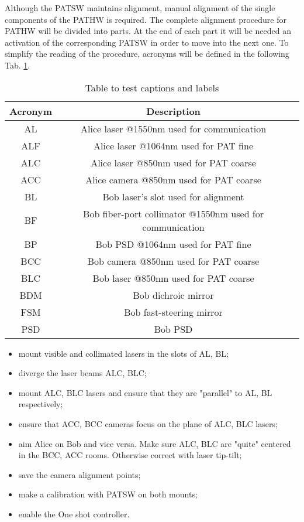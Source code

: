 Although the PATSW maintains alignment, manual alignment of the single components of the PATHW is required.
The complete alignment procedure for PATHW will be divided into parts. At the end of each part it will be needed an activation of the corresponding PATSW in order to move into the next one. To simplify the reading of the procedure, acronyms will be defined in the following Tab. \ref{table:1}.
\begin{table}[h!]
  \centering
  \begin{tabular}{ |c|c|c| }
    \hline
    Acronym & Description                                              \\
    \hline
    AL      & Alice laser @1550nm used for communication               \\
    ALF     & Alice laser @1064nm used for PAT fine                    \\
    ALC     & Alice laser @850nm used for PAT coarse                   \\
    ACC     & Alice camera @850nm used for PAT coarse                  \\
    \hline
    BL      & Bob laser's slot used for alignment                      \\
    BF      & Bob fiber-port collimator @1550nm used for communication \\
    BP      & Bob PSD @1064nm used for PAT fine                        \\
    BCC     & Bob camera @850nm used for PAT coarse                    \\
    BLC     & Bob laser @850nm used for PAT coarse                     \\
    BDM     & Bob dichroic mirror                                      \\
    FSM     & Bob fast-steering mirror                                 \\
    PSD     & Bob PSD                                                  \\
    \hline
  \end{tabular}
  \caption{Table to test captions and labels}
  \label{table:1}
\end{table}

\begin{itemize}
  \item mount visible and collimated lasers in the slots of AL, BL;
  \item diverge the laser beams ALC, BLC;
  \item mount ALC, BLC lasers and ensure that they are "parallel" to AL, BL respectively;
  \item ensure that ACC, BCC cameras focus on the plane of ALC, BLC lasers;
  \item aim Alice on Bob and vice versa. Make sure ALC, BLC are "quite" centered in the BCC, ACC rooms. Otherwise correct with laser tip-tilt;
  \item save the camera alignment points;
  \item make a calibration with PATSW on both mounts;
  \item enable the One shot controller.
\end{itemize}

